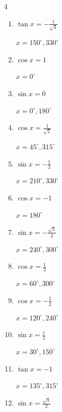 \begin{multicols}{4}
\begin{enumerate}
  \item $\displaystyle \tan{x}  = -\frac{1}{\sqrt{3}}$

        $\displaystyle x = 150^{\circ} , 330^{\circ}$

  \item $\displaystyle \cos{x}  = 1$

        $\displaystyle x = 0^{\circ}$

  \item $\displaystyle \sin{x}  = 0$

        $\displaystyle x = 0^{\circ} , 180^{\circ}$

  \item $\displaystyle \cos{x}  = \frac{1}{\sqrt{2}}$

        $\displaystyle x = 45^{\circ} , 315^{\circ}$

  \item $\displaystyle \sin{x}  = -\frac{1}{2}$

        $\displaystyle x = 210^{\circ} , 330^{\circ}$

  \item $\displaystyle \cos{x}  = -1$

        $\displaystyle x = 180^{\circ}$

\columnbreak %

  \item $\displaystyle \sin{x}  = -\frac{\sqrt{3}}{2}$

        $\displaystyle x = 240^{\circ} , 300^{\circ}$

  \item $\displaystyle \cos{x}  = \frac{1}{2}$

        $\displaystyle x = 60^{\circ} , 300^{\circ}$

  \item $\displaystyle \cos{x}  = -\frac{1}{2}$

        $\displaystyle x = 120^{\circ} , 240^{\circ}$

  \item $\displaystyle \sin{x}  = \frac{1}{2}$

        $\displaystyle x = 30^{\circ} , 150^{\circ}$

  \item $\displaystyle \tan{x}  = -1$

        $\displaystyle x = 135^{\circ} , 315^{\circ}$

  \item $\displaystyle \sin{x}  = \frac{\sqrt{3}}{2}$


\end{enumerate}
\end{multicols}
